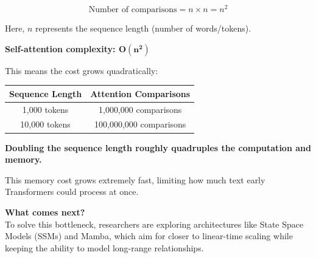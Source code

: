 \documentclass[11pt]{article}
\begin{document}
\vspace{0.02in}

\begin{center}
\[
\text{Number of comparisons} = n \times n = n^2
\]
\end{center}

\vspace{0.02in}

Here, $n$ represents the sequence length (number of words/tokens).

\vspace{0.02in}

\begin{center}
{\fontsize{12}{14}\selectfont
\color{brandnavy}\bfseries
Self-attention complexity: $\mathbf{O(n^2)}$
}
\end{center}

\vspace{0.05in}

This means the cost grows quadratically:

\vspace{0.02in}
\begin{center}
\renewcommand{\arraystretch}{1.2}
\begin{tabular}{c|c}
Sequence Length & Attention Comparisons \\ 
\hline
1,000 tokens & 1,000,000 comparisons \\
10,000 tokens & 100,000,000 comparisons
\end{tabular}
\end{center}
\vspace{0.02in}

\begin{center}
{\fontsize{12}{14}\selectfont\color{brandnavy}\bfseries
Doubling the sequence length roughly quadruples the computation and memory.
}
\end{center}

\vspace{0.05in}

This memory cost grows extremely fast, limiting how much text early Transformers could process at once.

\vspace{0.05in}

\begin{darkbox}
{\large\textbf{What comes next?}}\\[0.05in]
To solve this bottleneck, researchers are exploring architectures like State Space Models (SSMs) and Mamba, which aim for closer to linear-time scaling while keeping the ability to model long-range relationships.
\end{darkbox}
\end{document}
